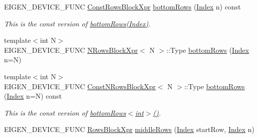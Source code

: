 \begin{DoxyCompactItemize}
E\+I\+G\+E\+N\+\_\+\+D\+E\+V\+I\+C\+E\+\_\+\+F\+U\+NC \mbox{\hyperlink{class_eigen_1_1_block}{Const\+Rows\+Block\+Xpr}} \mbox{\hyperlink{class_eigen_1_1_sparse_matrix_base_a7fe6a2433c70233623861c8fb4d9dad2}{bottom\+Rows}} (\mbox{\hyperlink{struct_eigen_1_1_eigen_base_a554f30542cc2316add4b1ea0a492ff02}{Index}} n) const
\begin{DoxyCompactList}\small\item\em This is the const version of \mbox{\hyperlink{class_eigen_1_1_sparse_matrix_base_a3035db49593e0d16a16e93a5cb405d02}{bottom\+Rows(\+Index)}}. \end{DoxyCompactList}\item 
{\footnotesize template$<$int N$>$ }\\E\+I\+G\+E\+N\+\_\+\+D\+E\+V\+I\+C\+E\+\_\+\+F\+U\+NC \mbox{\hyperlink{struct_eigen_1_1_sparse_matrix_base_1_1_n_rows_block_xpr}{N\+Rows\+Block\+Xpr}}$<$ N $>$\+::Type \mbox{\hyperlink{class_eigen_1_1_sparse_matrix_base_ab650ae58b1b3d03df6ebc0226388e0b9}{bottom\+Rows}} (\mbox{\hyperlink{struct_eigen_1_1_eigen_base_a554f30542cc2316add4b1ea0a492ff02}{Index}} n=N)
\item 
\mbox{\label{class_eigen_1_1_sparse_matrix_base_aff3bd6c461f4e51af2258f7cf1a22b42}} 
{\footnotesize template$<$int N$>$ }\\E\+I\+G\+E\+N\+\_\+\+D\+E\+V\+I\+C\+E\+\_\+\+F\+U\+NC \mbox{\hyperlink{struct_eigen_1_1_sparse_matrix_base_1_1_const_n_rows_block_xpr}{Const\+N\+Rows\+Block\+Xpr}}$<$ N $>$\+::Type \mbox{\hyperlink{class_eigen_1_1_sparse_matrix_base_aff3bd6c461f4e51af2258f7cf1a22b42}{bottom\+Rows}} (\mbox{\hyperlink{struct_eigen_1_1_eigen_base_a554f30542cc2316add4b1ea0a492ff02}{Index}} n=N) const
\begin{DoxyCompactList}\small\item\em This is the const version of \mbox{\hyperlink{class_eigen_1_1_sparse_matrix_base_a3035db49593e0d16a16e93a5cb405d02}{bottom\+Rows$<$int$>$()}}. \end{DoxyCompactList}\item 
E\+I\+G\+E\+N\+\_\+\+D\+E\+V\+I\+C\+E\+\_\+\+F\+U\+NC \mbox{\hyperlink{class_eigen_1_1_block}{Rows\+Block\+Xpr}} \mbox{\hyperlink{class_eigen_1_1_sparse_matrix_base_aa06954a6c3a27447c4a401f1bfc0fc3a}{middle\+Rows}} (\mbox{\hyperlink{struct_eigen_1_1_eigen_base_a554f30542cc2316add4b1ea0a492ff02}{Index}} start\+Row, \mbox{\hyperlink{struct_eigen_1_1_eigen_base_a554f30542cc2316add4b1ea0a492ff02}{Index}} n)
\item 

\end{DoxyCompactItemize}
